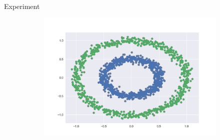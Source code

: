 \documentclass{beamer}
\begin{document}
\begin{frame}{Experiment}
\begin{figure}[h!]
\begin{subfigure}{.5\textwidth}
	\end{subfigure}%
	\begin{subfigure}{.5\textwidth}
		\centering
		\includegraphics[width=.8\linewidth]{c_figure_2.png}
	\end{subfigure}
\end{figure}
\end{frame}
\end{document}
